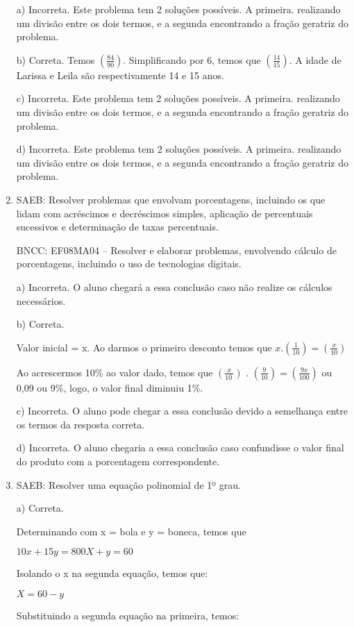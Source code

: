 \begin{enumerate}
a) Incorreta. Este problema tem 2 soluções possíveis. A primeira.
realizando um divisão entre os dois termos, e a segunda encontrando a
fração geratriz do problema.

b) Correta. Temos $(\frac{84}{90})$. Simplificando por 6, temos que
$(\frac{14}{15})$. A idade de Larissa e Leila são respectivamente 14 e
15 anos.

c) Incorreta. Este problema tem 2 soluções possíveis. A primeira.
realizando um divisão entre os dois termos, e a segunda encontrando a
fração geratriz do problema.

d) Incorreta. Este problema tem 2 soluções possíveis. A primeira.
realizando um divisão entre os dois termos, e a segunda encontrando a
fração geratriz do problema.

\item SAEB: Resolver problemas que envolvam porcentagens, incluindo os que
lidam com acréscimos e decréscimos simples, aplicação de percentuais
sucessivos e determinação de taxas percentuais.

BNCC: EF08MA04 -- Resolver e elaborar problemas, envolvendo cálculo de
porcentagens, incluindo o uso de tecnologias digitais.

a) Incorreta. O aluno chegará a essa conclusão caso não realize os
cálculos necessários.

b) Correta.

Valor inicial = x. Ao darmos o primeiro desconto temos que $x .
(\frac{1}{10}) = (\frac{x}{10})$

Ao acrescermos 10\% ao valor dado, temos que $(\frac{x}{10\ })$ .
$(\frac{9}{10}) = (\frac{9x}{100})$ ou 0,09 ou 9\%, logo, o valor
final diminuiu 1\%.

c) Incorreta. O aluno pode chegar a essa conclusão devido a
semelhança entre os termos da resposta correta.

d) Incorreta. O aluno chegaria a essa conclusão caso confundisse o
valor final do produto com a porcentagem correspondente.
\item SAEB: Resolver uma equação polinomial de 1º grau.

a) Correta. 

Determinando com x = bola e y = boneca, temos que

$10x + 15y = 800

X + y = 60$

Isolando o x na segunda equação, temos que:

$X = 60 - y$

Substituindo a segunda equação na primeira, temos:


\end{enumerate}
